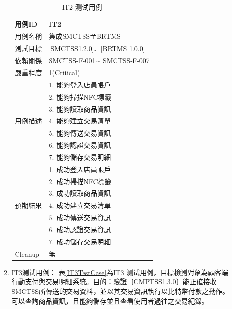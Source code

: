 \begin{enumerate}
\begin{enumerate}
						\begin{table}[htbp]
						\caption{IT2 测试用例} %
						\centering %
						\label{IT2TestCase} %
						\begin{tabular}{|l|l|}
						\hline
						用例ID & IT2 \\ \hline
						用例名稱 & 集成SMCTSS至BRTMS \\ \hline
						測試目標 & {[}SMCTSS1.2.0{]}、{[}BRTMS 1.0.0{]} \\ \hline
						依賴關係 & SMCTSS-F-001$\sim$ SMCTSS-F-007 \\ \hline
						嚴重程度 & 1(Critical) \\ \hline
						\multirow{7}{*}{用例描述} & 1.     能夠登入店員帳戶 \\ \cline{2-2} 
						 & 2.     能夠掃描NFC標籤 \\ \cline{2-2} 
						 & 3.     能夠讀取商品資訊 \\ \cline{2-2} 
						 & 4.     能夠建立交易清單 \\ \cline{2-2} 
						 & 5.     能夠傳送交易資訊 \\ \cline{2-2} 
						 & 6.     能夠認證交易資訊 \\ \cline{2-2} 
						 & 7.     能夠儲存交易明細 \\ \hline
						\multirow{7}{*}{預期結果} & 1.     成功登入店員帳戶 \\ \cline{2-2} 
						 & 2.     成功掃描NFC標籤 \\ \cline{2-2} 
						 & 3.     成功讀取商品資訊 \\ \cline{2-2} 
						 & 4.     成功建立交易清單 \\ \cline{2-2} 
						 & 5.     成功傳送交易資訊 \\ \cline{2-2} 
						 & 6.     成功認證交易資訊 \\ \cline{2-2} 
						 & 7.     成功儲存交易明細 \\ \hline
						Cleanup & 無 \\ \hline
						\end{tabular}
						\end{table}

				\item IT3测试用例：
					表\ref{IT3TestCase}為IT3 测试用例，目標檢測對象為顧客端行動支付與交易明細系統。目的：驗證〔CMPTSS1.3.0〕能正確接收SMCTSS所傳送的交易資料，並以其交易資訊執行以比特幣付款之動作。可以查詢商品資訊，且能夠儲存並且查看使用者過往之交易紀錄。


\end{enumerate}
\end{enumerate}
